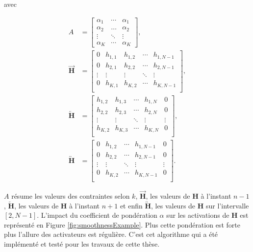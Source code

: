 avec

\begin{subequations}
\begin{align}
    A &=
\begin{bmatrix}
\alpha_1 &  \cdots & \alpha_1  \\
\alpha_2 & \dots & \alpha_2  \\
\vdots & \ddots &  \vdots \\
\alpha_K & \cdots & \alpha_K
\end{bmatrix}, \label{eq:subeq1}\\
    \overrightarrow{\mathbf{H}} &=
\begin{bmatrix}
0 & h_{1,1} & h_{1,2} & \cdots & h_{1,N-1}\\
0 & h_{2,1} & h_{2,2} & \cdots & h_{2,N-1}\\
\vdots & \vdots & \vdots & \ddots & \vdots\\
0 & h_{K,1} & h_{K,2} & \cdots & h_{K,N-1}\\
\end{bmatrix}, \label{eq:subeq2}\\
    \overleftarrow{\mathbf{H}} &=
\begin{bmatrix}
h_{1,2} & h_{1,3} & \cdots & h_{1,N} & 0\\
h_{2,2} & h_{2,3} & \cdots & h_{2,N} & 0\\
\vdots & \vdots & \ddots & \vdots & \vdots\\
h_{K,2} & h_{K,3} & \cdots & h_{K,N} & 0\\
\end{bmatrix}, \label{eq:subeq3}\\
    \overleftrightarrow{\mathbf{H}} &=
\begin{bmatrix}
0 & h_{1,2} & \cdots & h_{1,N-1} & 0\\
0 & h_{2,2} & \cdots & h_{2,N-1} & 0\\
\vdots & \vdots & \ddots & \vdots & \vdots\\
0 & h_{K,2} & \cdots & h_{K,N-1} & 0\\
\end{bmatrix}. \label{eq:subeq5}
\end{align}
\end{subequations}

$A$ résume les valeurs des contraintes selon $k$, $\overrightarrow{\mathbf{H}}$, les valeurs de $\mathbf{H}$ à l'instant $n-1$, $\overleftarrow{\mathbf{H}}$, les valeurs de $\mathbf{H}$ à l'instant $n+1$ et enfin $\overleftrightarrow{\mathbf{H}}$, les valeurs de $\mathbf{H}$ sur l'intervalle $\left[2,N-1 \right]$. L'impact du coefficient de pondération $\alpha$ sur les activations de $\mathbf{H}$ est représenté en Figure \ref{fig:smoothnessExample}. Plus cette pondération est forte plus l'allure des activateurs est régulière. C'est cet algorithme qui a été implémenté et testé pour les travaux de cette thèse.

